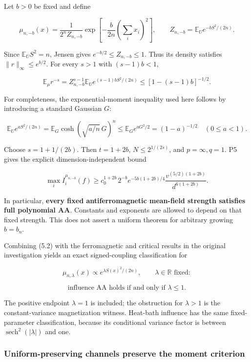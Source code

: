 Let \(b>0\) be fixed and define

\[
\mu_{n,-b}(x)=\frac{1}{2^nZ_{n,-b}}
\exp\left[-\frac b{2n}\left(\sum_i x_i\right)^2\right],
\qquad
Z_{n,-b}=\mathbb{E}_U e^{-bS^2/(2n)}.
\]

Since \(\mathbb{E}_US^2=n\), Jensen gives \(e^{-b/2}\le Z_{n,-b}\le 1\).
Thus its density satisfies \(\lVert r\rVert_\infty \le e^{b/2}\). For
every \(s>1\) with \((s-1)b<1\),

\[
\mathbb{E}_\mu r^{-s}
=Z_{n,-b}^{s-1}\mathbb{E}_Ue^{(s-1)bS^2/(2n)}
\le[1-(s-1)b]^{-1/2}.
\tag{5.1}
\]

For completeness, the exponential-moment inequality used here follows by
introducing a standard Gaussian \(G\):

\[
\mathbb{E}_Ue^{aS^2/(2n)}
=\mathbb{E}_G\cosh(\sqrt{a/n}\,G)^n
\le \mathbb{E}_Ge^{aG^2/2}=(1-a)^{-1/2}
\quad(0\le a<1).
\]

Choose \(s=1+1/(2b)\). Then \(t=1+2b\), \(N\le 2^{1/(2s)}\), and
\(p=\infty ,q=1\). P5 gives the explicit dimension-independent bound

\[
\boxed{\max_i I_i^{\mu_{n,-b}}(f)
\ge c_0^{1+2b}\,2^{-b}
e^{-5b(1+2b)/4}
\frac{v^{(5/2)(1+2b)}}{d^{6(1+2b)}}.}
\tag{5.2}
\]

In particular, \textbf{every fixed antiferromagnetic mean-field strength
satisfies full polynomial AA}. Constants and exponents are allowed to
depend on that fixed strength. This does not assert a uniform theorem
for arbitrary growing \(b=b_n\).

Combining (5.2) with the ferromagnetic and critical results in the
original investigation yields an exact signed-coupling classification
for

\[
\mu_{n,\lambda}(x)\propto e^{\lambda S(x)^2/(2n)},
\qquad\lambda\in\mathbb R\text{ fixed}:
\]

\[
\boxed{\text{influence AA holds if and only if }\lambda\le1.}
\]

The positive endpoint \(\lambda =1\) is included; the obstruction for
\(\lambda >1\) is the constant-variance magnetization witness. Heat-bath
influence has the same fixed-parameter classification, because its
conditional variance factor is between
\(\operatorname{sech}^2(|\lambda |)\) and one.

\subsubsection{Uniform-preserving channels preserve the moment
criterion}\label{proof:positive_structure:uniform-preserving-channels-preserve-the-moment-criterion}


